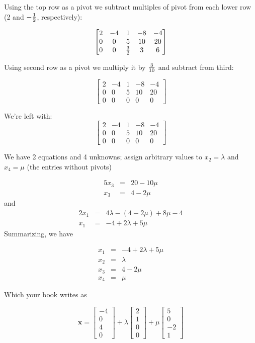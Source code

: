 \documentclass[10pt]{seminar}
\begin{document}
\begin{slide}
Using the top row as a pivot we subtract multiples of pivot from each lower row (2 and $-{1\over 2}$, respectively):

$$\begin{bmatrix}
2& -4& 1& -8&-4\\
0& 0& 5& 10&20\\
0& 0& {3\over 2}& 3&6
\end{bmatrix}
$$

Using second row as a pivot we multiply it by ${3\over 10}$ and subtract from third:

$$\begin{bmatrix}
2& -4& 1& -8&-4\\
0& 0& 5& 10&20\\
0& 0& 0& 0&0
\end{bmatrix}
$$

\newslide
We're left with:
$$\begin{bmatrix}
2& -4& 1& -8&-4\\
0& 0& 5& 10&20\\
0& 0& 0& 0&0
\end{bmatrix}
$$

We have 2 equations and 4 unknowns; assign arbitrary values to $x_2=\lambda$ and $x_4=\mu$ (the entries without pivots)

$$\begin{array}{rcl}5x_3&=&20-10\mu\\
 x_3&=&4-2\mu
 \end{array}
$$ and 
$$\begin{array}{rcl}2x_1&=&4\lambda-(4-2\mu)+8\mu-4\\
x_1&=&-4+2\lambda+5\mu
\end{array}
$$ 
\newpage
Summarizing, we have

$$\begin{array}{rcl}
x_1&=&-4+2\lambda+5\mu\\
x_2&=&\lambda\\
 x_3&=&4-2\mu\\
 x_4&=&\mu
\end{array}$$

Which your book writes as

$$\mathbf{x}=
\begin{bmatrix}
-4\\0\\4\\0
\end{bmatrix}
+\lambda
\begin{bmatrix}
2\\1\\0\\0
\end{bmatrix}
+\mu
\begin{bmatrix}
5\\0\\-2\\1
\end{bmatrix}
$$


\end{slide}
\end{document}
